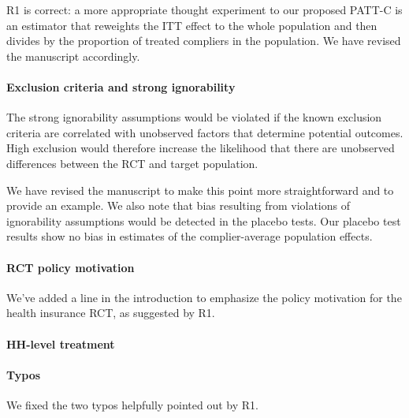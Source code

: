 \documentclass[hidelinks,12pt,letterpaper]{article}
\begin{document}
R1 is correct: a more appropriate thought experiment to our proposed PATT-C is an estimator that reweights the ITT effect to the whole population and then divides by the proportion of treated compliers in the population. We have revised the manuscript accordingly. 

\paragraph*{Exclusion criteria and strong ignorability}

The strong ignorability assumptions would be violated if the known exclusion criteria are correlated with unobserved factors that determine potential outcomes. High exclusion would therefore increase the likelihood that there are unobserved differences between the RCT and target population.  

We have revised the manuscript to make this point more straightforward and to provide an example. We also note that bias resulting from violations of ignorability assumptions would be detected in the placebo tests. Our placebo test results show no bias in estimates of the complier-average population effects. 

\paragraph*{RCT policy motivation}

We've added a line  in the introduction to emphasize the policy motivation for the health insurance RCT, as suggested by R1. 

\paragraph*{HH-level treatment}

\paragraph*{Typos}
We fixed the two typos helpfully pointed out by R1. 
\end{document}
